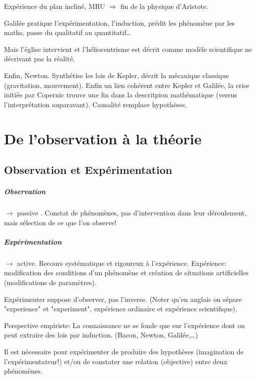 \documentclass{report}
\begin{document}
	Expérience du plan incliné, MRU $\Rightarrow$ fin de la physique d'Aristote.
	
	Galilée pratique l'expérimentation, l'induction, prédit les phénomène par les maths, passe du qualitatif au quantitatif\dots
	
	Mais l'église intervient et l'héliocentrisme est décrit comme modèle scientifique ne décrivant pas la réalité.
	
	Enfin, Newton. Synthétise les lois de Kepler, décrit la mécanique classique (gravitation, mouvement). Enfin un lien cohérent entre Kepler et Galilée, la crise initiée par Copernic trouve une fin dans la descritpion mathématique (versus l'interprétation auparavant). Causalité remplace hypothèses.
	
	\chapter{De l'observation à la théorie}
	
	\section{Observation et Expérimentation}
	
	\paragraph{Observation} $\rightarrow$ \og passive \fg. Constat de phénomènes, pas d’intervention dans leur déroulement, mais sélection de ce que l’on observe!
	\paragraph{Expérimentation} $\rightarrow$ active. Recours systématique et rigoureux à l’expérience. Expérience: modification des conditions d’un phénomène et création de situations artificielles (modifications de paramètres).
	
	Expérimenter suppose d'observer, pas l'inverse. (Noter qu'en anglais on sépare "experience" et "experiment", expérience ordinaire et expérience scientifique).
	
	Perspective empiriste: La connaissance ne se fonde que sur l’expérience dont on peut extraire des lois par induction. (Bacon, Newton, Galilée,\dots)
	
	Il est nécessaire pour expérimenter de produire des hypothèses (imagination de l'expérimentateur!) et/ou de constater une relation (objective) entre deux phénomènes.
	
\end{document}
